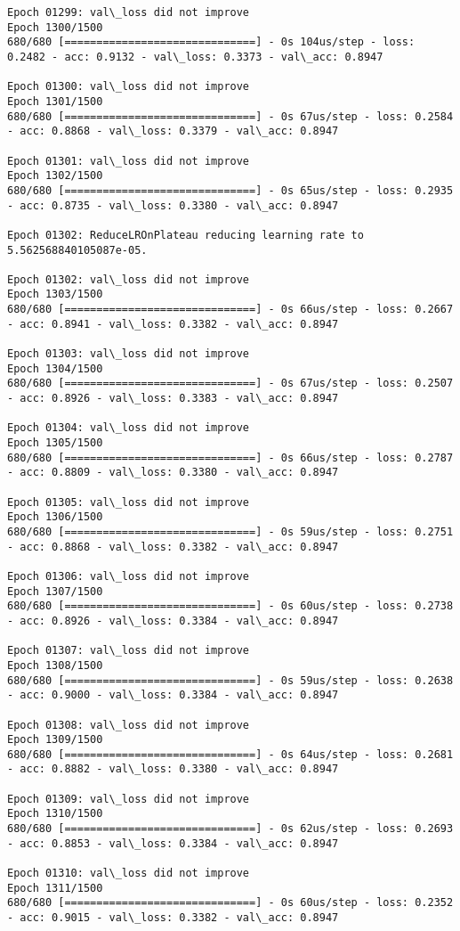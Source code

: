 \documentclass[11pt]{article}
\begin{document}
\begin{Verbatim}[commandchars=\\\{\}]
Epoch 01299: val\_loss did not improve
Epoch 1300/1500
680/680 [==============================] - 0s 104us/step - loss: 0.2482 - acc: 0.9132 - val\_loss: 0.3373 - val\_acc: 0.8947

Epoch 01300: val\_loss did not improve
Epoch 1301/1500
680/680 [==============================] - 0s 67us/step - loss: 0.2584 - acc: 0.8868 - val\_loss: 0.3379 - val\_acc: 0.8947

Epoch 01301: val\_loss did not improve
Epoch 1302/1500
680/680 [==============================] - 0s 65us/step - loss: 0.2935 - acc: 0.8735 - val\_loss: 0.3380 - val\_acc: 0.8947

Epoch 01302: ReduceLROnPlateau reducing learning rate to 5.562568840105087e-05.

Epoch 01302: val\_loss did not improve
Epoch 1303/1500
680/680 [==============================] - 0s 66us/step - loss: 0.2667 - acc: 0.8941 - val\_loss: 0.3382 - val\_acc: 0.8947

Epoch 01303: val\_loss did not improve
Epoch 1304/1500
680/680 [==============================] - 0s 67us/step - loss: 0.2507 - acc: 0.8926 - val\_loss: 0.3383 - val\_acc: 0.8947

Epoch 01304: val\_loss did not improve
Epoch 1305/1500
680/680 [==============================] - 0s 66us/step - loss: 0.2787 - acc: 0.8809 - val\_loss: 0.3380 - val\_acc: 0.8947

Epoch 01305: val\_loss did not improve
Epoch 1306/1500
680/680 [==============================] - 0s 59us/step - loss: 0.2751 - acc: 0.8868 - val\_loss: 0.3382 - val\_acc: 0.8947

Epoch 01306: val\_loss did not improve
Epoch 1307/1500
680/680 [==============================] - 0s 60us/step - loss: 0.2738 - acc: 0.8926 - val\_loss: 0.3384 - val\_acc: 0.8947

Epoch 01307: val\_loss did not improve
Epoch 1308/1500
680/680 [==============================] - 0s 59us/step - loss: 0.2638 - acc: 0.9000 - val\_loss: 0.3384 - val\_acc: 0.8947

Epoch 01308: val\_loss did not improve
Epoch 1309/1500
680/680 [==============================] - 0s 64us/step - loss: 0.2681 - acc: 0.8882 - val\_loss: 0.3380 - val\_acc: 0.8947

Epoch 01309: val\_loss did not improve
Epoch 1310/1500
680/680 [==============================] - 0s 62us/step - loss: 0.2693 - acc: 0.8853 - val\_loss: 0.3384 - val\_acc: 0.8947

Epoch 01310: val\_loss did not improve
Epoch 1311/1500
680/680 [==============================] - 0s 60us/step - loss: 0.2352 - acc: 0.9015 - val\_loss: 0.3382 - val\_acc: 0.8947


\end{Verbatim}
\end{document}

